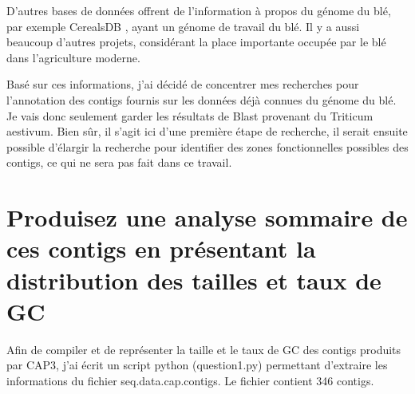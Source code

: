 \documentclass[10.9pt]{article} %
\begin{document}
D'autres bases de données offrent de l'information à propos du génome du blé, par exemple CerealsDB \cite{cerealsDB}, ayant un génome
de travail du blé. Il y a aussi beaucoup d'autres projets, considérant la place importante occupée par le blé dans l'agriculture moderne.

Basé sur ces informations, j'ai décidé de concentrer mes recherches pour l'annotation des contigs fournis sur les données déjà
connues du génome du blé. Je vais donc seulement garder les résultats de Blast provenant du Triticum aestivum. Bien sûr, il s'agit
ici d'une première étape de recherche, il serait ensuite possible d'élargir la recherche pour identifier des zones fonctionnelles possibles
des contigs, ce qui ne sera pas fait dans ce travail.


\newpage
\section{Produisez une analyse sommaire de ces contigs en présentant la distribution des tailles et taux de GC} %

Afin de compiler et de représenter la taille et le taux de GC des contigs produits par
CAP3, j'ai écrit un script python (question1.py) permettant d'extraire les informations du
fichier seq.data.cap.contigs. Le fichier contient 346 contigs.
\end{document}

